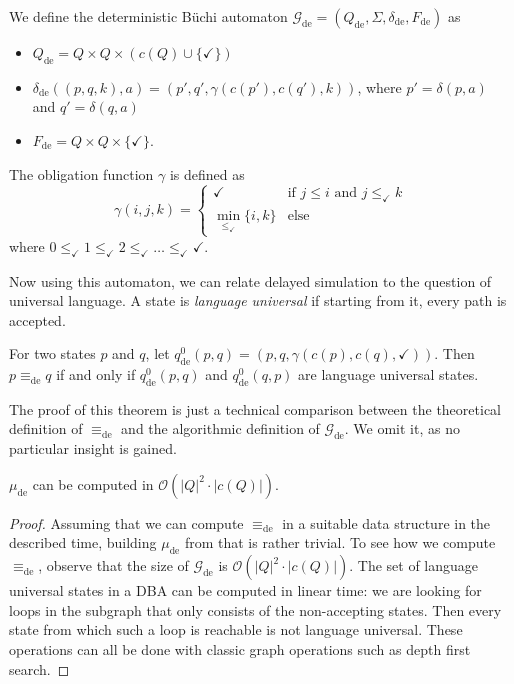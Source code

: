 \begin{definition}
	We define the deterministic B\"uchi automaton $\mathcal{G}_\text{de} = (Q_\text{de}, \Sigma, \delta_\text{de}, F_\text{de})$ as 
	\begin{itemize}
		\item $Q_\text{de} = Q \times Q \times (c(Q) \cup \{\checkmark\})$
		\item $\delta_\text{de}((p, q, k), a) = (p', q', \gamma(c(p'), c(q'), k))$, where $p' = \delta(p, a)$ and $q' = \delta(q, a)$
		\item $F_\text{de} = Q \times Q \times \{\checkmark\}$.
	\end{itemize}

	The obligation function $\gamma$ is defined as $$\gamma(i, j, k) = \begin{cases}
		\checkmark & \text{if } j \leq i \text{ and } j \leq_\checkmark k \\
		\min_{\leq_\checkmark} \{i, k\} & \text{else}
	\end{cases}$$ where $0 \leq_\checkmark 1 \leq_\checkmark 2 \leq_\checkmark \dots \leq_\checkmark \checkmark$.
\end{definition}

Now using this automaton, we can relate delayed simulation to the question of universal language. A state is \emph{language universal} if starting from it, every path is accepted.

\begin{theorem}
	For two states $p$ and $q$, let $q_\text{de}^0(p, q) = (p, q, \gamma(c(p), c(q), \checkmark))$. Then $p \equiv_\text{de} q$ if and only if $q_\text{de}^0(p, q)$ and $q_\text{de}^0(q, p)$ are language universal states.
	\label{thm:Gde_related}
\end{theorem}

The proof of this theorem is just a technical comparison between the theoretical definition of $\equiv_\text{de}$ and the algorithmic definition of $\mathcal{G}_\text{de}$. We omit it, as no particular insight is gained.


\begin{theorem}
	$\mu_\text{de}$ can be computed in $\mathcal{O}(|Q|^2 \cdot |c(Q)|)$.
\end{theorem}

\begin{proof}
	Assuming that we can compute $\equiv_\text{de}$ in a suitable data structure in the described time, building $\mu_\text{de}$ from that is rather trivial. To see how we compute $\equiv_\text{de}$, observe that the size of $\mathcal{G}_\text{de}$ is $\mathcal{O}(|Q|^2 \cdot |c(Q)|)$. The set of language universal states in a DBA can be computed in linear time: we are looking for loops in the subgraph that only consists of the non-accepting states. Then every state from which such a loop is reachable is not language universal. These operations can all be done with classic graph operations such as depth first search.
\end{proof}
